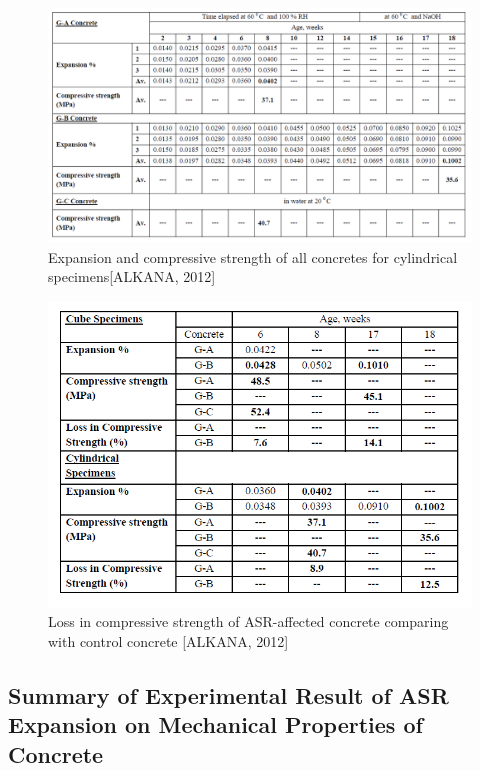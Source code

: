 \begin{figure}[h!]
  \centering
  \includegraphics[width=1.0\linewidth]{Reference/ALKANASR2.png}
  \caption{Expansion and compressive strength of all concretes for cylindrical specimens[ALKANA, 2012]}
  \label{ALKANA2}
\end{figure}

\begin{figure}[h!]
  \centering
  \includegraphics[width=1.0\linewidth]{Reference/ALKANASR3.png}
  \caption{Loss in compressive strength of ASR-affected concrete comparing with control concrete [ALKANA, 2012]}
  \label{ALKANA3}
\end{figure}

\clearpage
\subsection{Summary of Experimental Result of ASR Expansion on Mechanical Properties of Concrete}

